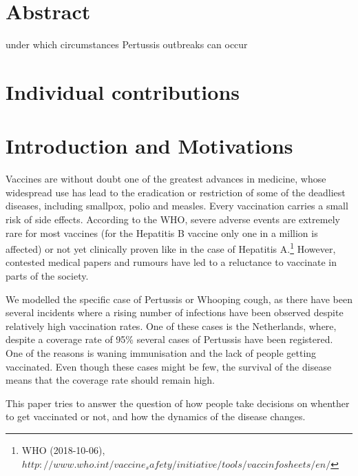 \documentclass[11pt]{article}
\begin{document}

\tableofcontents

\newpage




\section{Abstract}

under which circumstances Pertussis outbreaks can occur

\section{Individual contributions}

\section{Introduction and Motivations}

Vaccines are without doubt one of the greatest advances in medicine, whose widespread use has lead to the eradication or restriction of some of the deadliest diseases, including smallpox, polio and measles. Every vaccination carries a small risk of side effects. According to the WHO, severe adverse events are extremely rare for most vaccines (for the Hepatitis B vaccine only one in a million is affected) or not yet clinically proven like in the case of Hepatitis A.\footnote{WHO (2018-10-06), $http://www.who.int/vaccine_safety/initiative/tools/vaccinfosheets/en/$}  However, contested medical papers and rumours have led to a reluctance to vaccinate in parts of the society.

\vspace{14px}

We modelled the specific case of Pertussis or Whooping cough, as there have been several incidents where a rising number of infections have been observed despite relatively high vaccination rates. One of these cases is the Netherlands, where, despite a coverage rate of 95\% several cases of Pertussis have been registered. One of the reasons is waning immunisation and the lack of people getting vaccinated. Even though these cases might be few, the survival of the disease means that the coverage rate should remain high. 

This paper tries to answer the question of how people take decisions on whenther to get vaccinated or not, and how the dynamics of the disease changes. 
\end{document}
